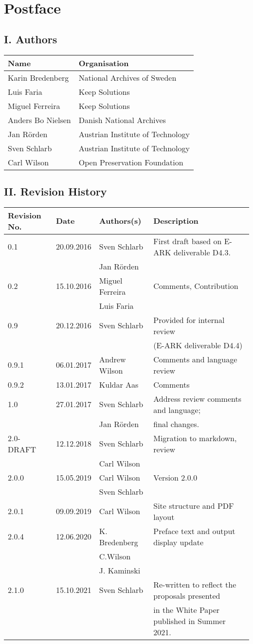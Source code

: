 \hypertarget{postface}{%
\section*{Postface}\label{postface}}

\hypertarget{i-authors}{%
\subsection*{I. Authors}\label{i-authors}}

\begin{longtable}[]{@{}ll@{}}
\toprule
Name & Organisation\tabularnewline
\midrule
\endhead
Karin Bredenberg & National Archives of Sweden\tabularnewline
Luis Faria & Keep Solutions\tabularnewline
Miguel Ferreira & Keep Solutions\tabularnewline
Anders Bo Nielsen & Danish National Archives\tabularnewline
Jan Rörden & Austrian Institute of Technology\tabularnewline
Sven Schlarb & Austrian Institute of Technology\tabularnewline
Carl Wilson & Open Preservation Foundation\tabularnewline
\bottomrule
\end{longtable}

\hypertarget{ii-revision-history}{%
\subsection*{II. Revision History}\label{ii-revision-history}}

\begin{longtable}[]{@{}llll@{}}
\toprule
Revision No. & Date & Authors(s) & Description\tabularnewline
\midrule
\endhead
0.1 & 20.09.2016 & Sven Schlarb & First draft based on E-ARK deliverable
D4.3.\tabularnewline
& & Jan Rörden &\tabularnewline
0.2 & 15.10.2016 & Miguel Ferreira & Comments,
Contribution\tabularnewline
& & Luis Faria &\tabularnewline
0.9 & 20.12.2016 & Sven Schlarb & Provided for internal
review\tabularnewline
& & & (E-ARK deliverable D4.4)\tabularnewline
0.9.1 & 06.01.2017 & Andrew Wilson & Comments and language
review\tabularnewline
0.9.2 & 13.01.2017 & Kuldar Aas & Comments\tabularnewline
1.0 & 27.01.2017 & Sven Schlarb & Address review comments and
language;\tabularnewline
& & Jan Rörden & final changes.\tabularnewline
2.0-DRAFT & 12.12.2018 & Sven Schlarb & Migration to markdown,
review\tabularnewline
& & Carl Wilson &\tabularnewline
2.0.0 & 15.05.2019 & Carl Wilson & Version 2.0.0\tabularnewline
& & Sven Schlarb &\tabularnewline
2.0.1 & 09.09.2019 & Carl Wilson & Site structure and PDF
layout\tabularnewline
2.0.4 & 12.06.2020 & K. Bredenberg & Preface text and output display
update\tabularnewline
& & C.Wilson &\tabularnewline
& & J. Kaminski &\tabularnewline
2.1.0 & 15.10.2021 & Sven Schlarb & Re-written to reflect the proposals
presented\tabularnewline
& & & in the White Paper published in Summer 2021.\tabularnewline
\bottomrule
\end{longtable}

